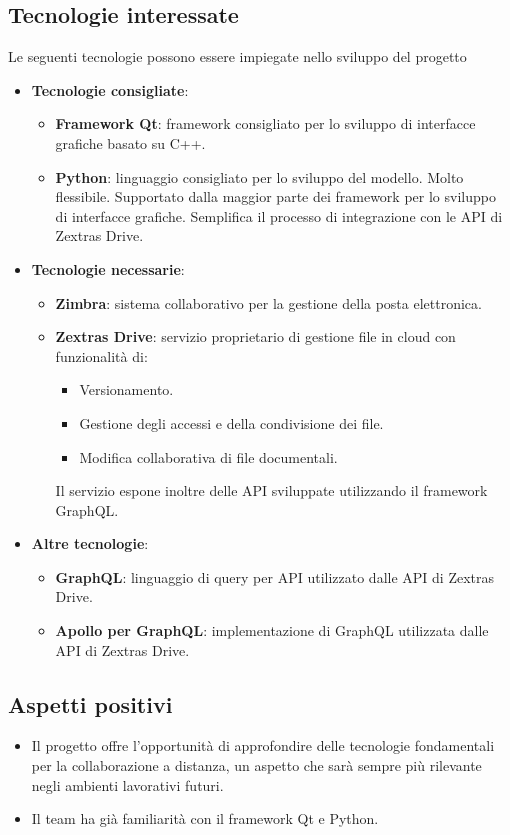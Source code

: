 \subsection{Tecnologie interessate}
Le seguenti tecnologie possono essere impiegate nello sviluppo del progetto
\begin{itemize}
\item \textbf{Tecnologie consigliate}:
\begin{itemize}
	\item \textbf{Framework Qt}: framework consigliato per lo sviluppo di interfacce grafiche basato su C++.
	\item \textbf{Python}: linguaggio consigliato per lo sviluppo del modello. Molto flessibile. Supportato dalla maggior parte dei framework per lo sviluppo di interfacce grafiche. 
	Semplifica il processo di integrazione con le API di Zextras Drive.
	\end{itemize}
\newpage
\item \textbf{Tecnologie necessarie}:
	\begin{itemize}
	\item \textbf{Zimbra}: sistema collaborativo per la gestione della posta elettronica.
	\item \textbf{Zextras Drive}: servizio proprietario di gestione file in cloud con funzionalità di:
		\begin{itemize}
		\item Versionamento.
		\item Gestione degli accessi e della condivisione dei file.
		\item Modifica collaborativa di file documentali.
		\end{itemize}
	Il servizio espone inoltre delle API sviluppate utilizzando il framework GraphQL.
\end{itemize}
\item \textbf{Altre tecnologie}:
	\begin{itemize}
	\item \textbf{GraphQL}: linguaggio di query per API utilizzato dalle API di Zextras Drive.	
	\item \textbf{Apollo per GraphQL}: implementazione di GraphQL utilizzata dalle API di Zextras Drive.
	\end{itemize}
\end{itemize}

\subsection{Aspetti positivi}
\begin{itemize}
\item Il progetto offre l'opportunità di approfondire delle tecnologie fondamentali per la collaborazione a distanza, un aspetto che sarà sempre più rilevante negli ambienti lavorativi futuri.
\item Il team ha già familiarità con il framework Qt e Python.
\end{itemize}

